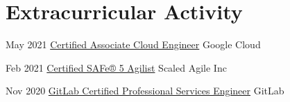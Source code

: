 \documentclass[a4paper]{twentysecondcv} %
\begin{document}

\section{Extracurricular Activity}
%
\begin{twenty} %
    \twentyitem
    {May 2021}
    {}
    {\href{https://www.credential.net/3e7c1e77-e591-40d3-88ff-67494b422cfc?key=9d07014f6e1465d00a525436cfdb53cc8b7fd70ae353b12ea668dee572d2c797}{Certified Associate Cloud Engineer}}
    {Google Cloud}
    {}
    {}

    \twentyitem
    {Feb 2021}
    {}
    {\href{https://www.youracclaim.com/badges/deb40f91-a445-4e73-aed5-714988eefd80/}{Certified SAFe® 5 Agilist}}
    {Scaled Agile Inc}
    {}
    {}

    \twentyitem
    {Nov 2020}
    {}
    {\href{https://badgr.com/public/assertions/xTTcUSNHQ2egBleFLPkXiQ}{GitLab Certified Professional Services Engineer}}
    {GitLab}
    {}
    {}


\end{twenty}
\end{document}
